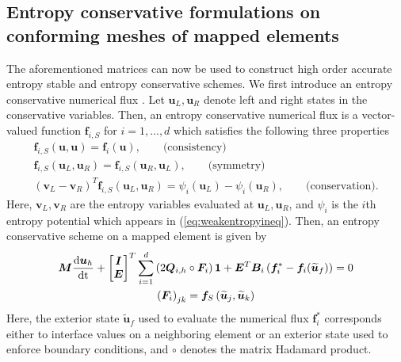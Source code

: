 \documentclass{svjour3}                     %
\renewcommand{\tilde}{\widetilde}
\newcommand{\td}[2]{\frac{{\rm d}#1}{{\rm d}{\rm #2}}}
\newcommand{\LRp}[1]{\left( #1 \right)}
\begin{document}
\subsection{Entropy conservative formulations on conforming meshes of mapped elements}

The aforementioned matrices can now be used to construct high order accurate entropy stable and entropy conservative schemes.  We first introduce an entropy conservative numerical flux \cite{tadmor1987numerical}.  Let $\bm{u}_L, \bm{u}_R$ denote left and right states in the conservative variables.  Then, an entropy conservative numerical flux is a vector-valued function $\bm{f}_{i,S}$ for $i = 1,\ldots,d$ which satisfies the following three properties
\begin{gather*}
\bm{f}_{i,S}\LRp{\bm{u},\bm{u}} = \bm{f}_i(\bm{u}), \qquad \text{(consistency)}\\
\bm{f}_{i,S}\LRp{\bm{u}_L,\bm{u}_R} = \bm{f}_{i,S}(\bm{u}_R,\bm{u}_L), \qquad \text{(symmetry)}\\
\LRp{\bm{v}_L-\bm{v}_R}^T\bm{f}_{i,S}\LRp{\bm{u}_L,\bm{u}_R} = \psi_i(\bm{u}_L) - \psi_i(\bm{u}_R), \qquad \text{(conservation)}.
\end{gather*}
Here, $\bm{v}_L, \bm{v}_R$ are the entropy variables evaluated at $\bm{u}_L, \bm{u}_R$, and $\psi_i$ is the $i$th entropy potential which appears in (\ref{eq:weakentropyineq}).  
Then, an entropy conservative scheme on a mapped element is given by
\begin{gather}
{\bm{M}}\td{\bm{u}_h}{t} + \begin{bmatrix} \bm{I} \\ \bm{E} \end{bmatrix}^T
\sum_{i=1}^d \LRp{2{\bm{Q}}_{i,h} \circ \bm{F}_i}\bm{1} + \bm{E}^T{\bm{B}}_i\LRp{\bm{f}_i^*-\bm{f}_i(\tilde{\bm{u}}_f)} = 0 \label{eq:esdg}\\
\LRp{\bm{F}_i}_{jk} = \bm{f}_S\LRp{\tilde{\bm{u}}_j,\tilde{\bm{u}}_k} \nonumber
\end{gather}
Here, the exterior state $\tilde{\bm{u}}_f$ used to evaluate the numerical flux $\bm{f}_i^*$ corresponds either to interface values on a neighboring element or an exterior state used to enforce boundary conditions, and $\circ$ denotes the matrix Hadamard product.  
\end{document}
